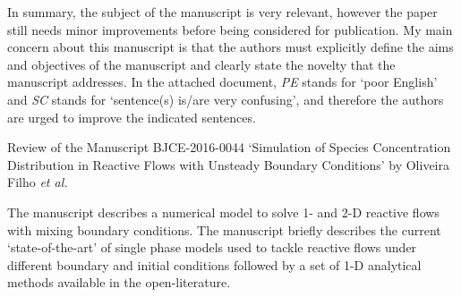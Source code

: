 \documentclass[14pt,twoside]{report}
\begin{document}
In summary, the subject of the manuscript is very relevant, however the paper still needs minor improvements before being considered for publication. My main concern about this manuscript is that the authors must explicitly define the aims and objectives of the manuscript and clearly state the novelty that the manuscript addresses.  In the attached document, {\it PE} stands for `poor English' and {\it SC} stands for `sentence(s) is/are very confusing', and therefore the authors are urged to improve the indicated sentences.

{
  }



\clearpage





\begin{center}
  {\Large Review of the Manuscript BJCE-2016-0044 `Simulation of Species Concentration Distribution in Reactive Flows with Unsteady Boundary Conditions' by Oliveira Filho {\it et al.}}
\end{center}

\medskip

The manuscript describes a numerical model to solve 1- and 2-D reactive flows with mixing boundary conditions. The manuscript briefly describes the current `state-of-the-art' of single phase models used to tackle reactive flows under different boundary and initial conditions followed by a set of 1-D analytical methods available in the open-literature.  
\end{document}
